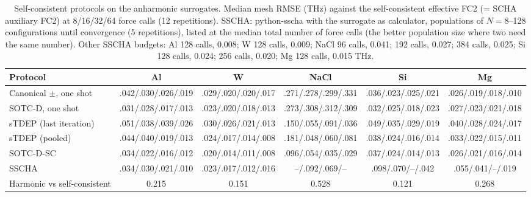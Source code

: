 \begin{table}[t]
\caption{Self-consistent protocols on the anharmonic surrogates. Median mesh RMSE (THz) against the self-consistent effective FC2 (= SCHA auxiliary FC2) at 8/16/32/64 force calls (12 repetitions). SSCHA: python-sscha with the surrogate as calculator, populations of $N=8$--128 configurations until convergence (5 repetitions), listed at the median total number of force calls (the better population size where two need the same number). Other SSCHA budgets: Al 128 calls, 0.008; W 128 calls, 0.009; NaCl 96 calls, 0.041; 192 calls, 0.027; 384 calls, 0.025; Si 128 calls, 0.024; 256 calls, 0.020; Mg 128 calls, 0.015 THz.}
\label{tab:sc_surrogate}
\begin{ruledtabular}
\footnotesize
\begin{tabular}{lccccc}
Protocol & Al & W & NaCl & Si & Mg\\
\hline
Canonical $\pm$, one shot & .042/.030/.026/.019 & .029/.020/.020/.017 & .271/.278/.299/.331 & .036/.023/.025/.021 & .026/.019/.018/.010\\
SOTC-D, one shot & .031/.028/.017/.013 & .023/.020/.018/.013 & .273/.308/.312/.309 & .032/.025/.018/.023 & .027/.023/.021/.018\\
sTDEP (last iteration) & .051/.038/.039/.026 & .030/.026/.021/.013 & .150/.055/.091/.036 & .049/.035/.029/.019 & .040/.028/.024/.017\\
sTDEP (pooled) & .044/.040/.019/.013 & .024/.017/.014/.008 & .181/.048/.060/.081 & .038/.024/.016/.014 & .033/.022/.015/.011\\
SOTC-D-SC & .034/.022/.016/.012 & .020/.014/.011/.008 & .096/.054/.035/.029 & .037/.024/.014/.013 & .026/.021/.016/.014\\
SSCHA & .034/.030/.021/.010 & .023/.017/.012/.016 & --/.092/.069/-- & .098/.070/--/.042 & .055/.041/--/.019\\
\hline
Harmonic vs self-consistent & 0.215 & 0.151 & 0.528 & 0.121 & 0.268\\
\end{tabular}
\end{ruledtabular}
\end{table}
